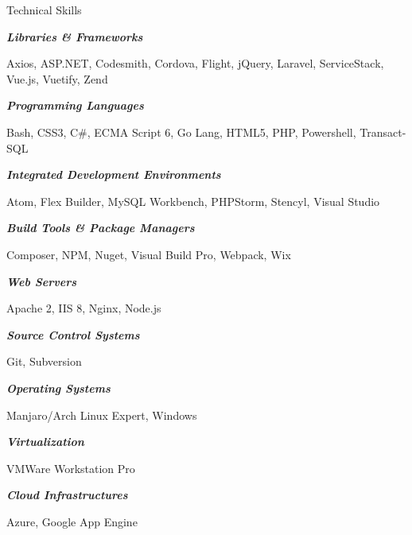 \documentclass{resume} %
\begin{document}

\begin{rSection}{Technical Skills}

\begin{rSubsection}{}{}{}{}

\item[] \textbf{\textit{Libraries \& Frameworks}}
\item Axios, ASP.NET, Codesmith, Cordova, Flight, jQuery, Laravel, ServiceStack, Vue.js, Vuetify, Zend
\smallskip

\item[] \textbf{\textit{Programming Languages}}
\item Bash, CSS3, C\#, ECMA Script 6, Go Lang, HTML5, PHP, Powershell, Transact-SQL
\vspace{3mm}

\item[] \textbf{\textit{Integrated Development Environments}}
\item Atom, Flex Builder, MySQL Workbench, PHPStorm, Stencyl, Visual Studio
\vspace{3mm}

\item[] \textbf{\textit{Build Tools \& Package Managers}}
\item Composer, NPM, Nuget, Visual Build Pro, Webpack, Wix
\vspace{3mm}

\item[] \textbf{\textit{Web Servers}}
\item Apache 2, IIS 8, Nginx, Node.js
\vspace{3mm}

\item[] \textbf{\textit{Source Control Systems}}
\item Git, Subversion
\vspace{3mm}

\item[] \textbf{\textit{Operating Systems}}
\item Manjaro/Arch Linux Expert, Windows
\vspace{3mm}

\item[] \textbf{\textit{Virtualization}}
\item VMWare Workstation Pro
\vspace{3mm}

\item[] \textbf{\textit{Cloud Infrastructures}}
\item Azure, Google App Engine

\end{rSubsection}

\end{rSection}
\end{document}

